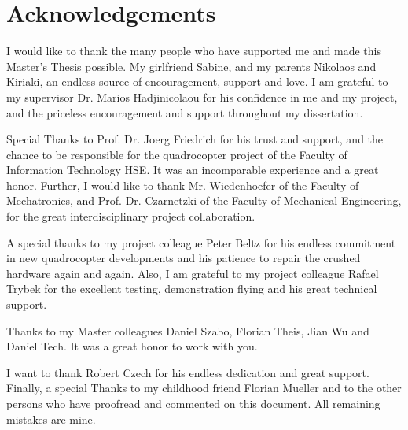 \chapter*{Acknowledgements}

I would like to thank the many people who have supported me and made this Master's Thesis possible. 
My girlfriend Sabine, and my parents Nikolaos and Kiriaki, an endless source of encouragement, support and love.
I am grateful to my supervisor Dr. Marios Hadjinicolaou for his confidence in me and my project, and
the priceless encouragement and support throughout my dissertation. 

Special Thanks to Prof. Dr. Joerg Friedrich for his trust and support, and the chance to be responsible for the quadrocopter project of the Faculty of Information Technology \gls{HSE}. It was an incomparable experience and a great honor. Further, I would like to thank Mr. Wiedenhoefer of the Faculty of Mechatronics, and Prof. Dr. Czarnetzki of the Faculty of Mechanical Engineering, for the great interdisciplinary project collaboration.

A special thanks to my project colleague Peter Beltz for his endless commitment in new quadrocopter developments and his patience to repair the crushed hardware again and again. Also, I am grateful to my project colleague Rafael Trybek for the excellent testing, demonstration flying and his great technical support. 

Thanks to my Master colleagues Daniel Szabo, Florian Theis, Jian Wu and Daniel Tech. It was a great honor to work with you. 

I want to thank Robert Czech for his endless dedication and great support. Finally, a special Thanks to my childhood friend Florian Mueller and to the other persons who have proofread and commented on this document. All remaining mistakes are mine. 